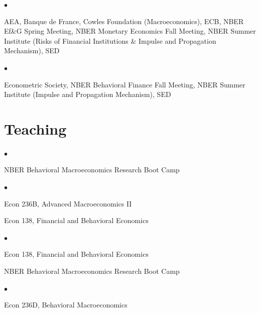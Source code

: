 \documentclass[line]{res}
\newenvironment{list1}{
  \begin{list}{\ding{113}}{%
      \setlength{\itemsep}{0.07in}
      \setlength{\parsep}{0in} \setlength{\parskip}{0in}
		\setlength{\topsep}{0.07in} \setlength{\partopsep}{0in} 
      \setlength{\leftmargin}{0.0in}}}{\end{list}}
\newenvironment{list2}{
  \begin{list}{$\bullet$}{%
      \setlength{\itemsep}{0in}
      \setlength{\parsep}{0in} \setlength{\parskip}{0in}
      \setlength{\topsep}{0in} \setlength{\partopsep}{0in} 
      \setlength{\leftmargin}{0in}}}{\end{list}}
\begin{document}
\begin{resume}
\begin{list1}
\item[2017] 
\begin{list2}
\item[] AEA, Banque de France, Cowles Foundation (Macroeconomics), ECB, NBER Ef\&G Spring Meeting, NBER Monetary Economics Fall Meeting, NBER Summer Institute (Risks of Financial Institutions \& Impulse and Propagation Mechanism), SED
\end{list2}

\item[2016] 
\begin{list2}
\item[] Econometric Society, NBER Behavioral Finance Fall Meeting, NBER Summer Institute (Impulse and Propagation Mechanism), SED
\end{list2}


\end{list1}




\section{\sc Teaching}
\begin{list1}
\item[2024]  
\begin{list2}
\item[] NBER Behavioral Macroeconomics Research Boot Camp
\end{list2}

\item[2023]  
\begin{list2}
\item[] Econ 236B, Advanced Macroeconomics II
\vspace{0.2cm}
\item[] Econ 138, Financial and Behavioral Economics
\end{list2}

\item[2022]  
\begin{list2}
\item[] Econ 138, Financial and Behavioral Economics
\vspace{0.2cm}
\item[] NBER Behavioral Macroeconomics Research Boot Camp
\end{list2}

\item[2021]  
\begin{list2}
\item[] Econ 236D, Behavioral Macroeconomics
\end{list2}


\end{list1}
\end{resume}
\end{document}
